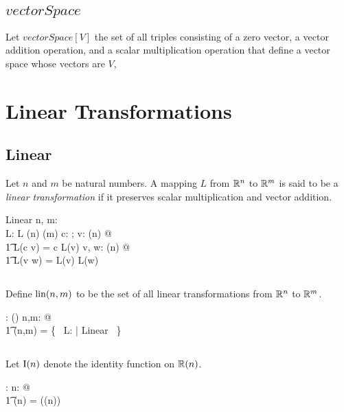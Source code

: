 \documentclass[11pt, oneside]{article}
\begin{document}
\subsection{$vectorSpace$}

Let $vectorSpace[V]$ the set of all triples consisting of a zero vector, a vector addition operation, and a scalar multiplication operation
that define a vector space whose vectors are $V$,

\section{Linear Transformations}

\subsection{Linear}

Let $n$ and $m$ be natural numbers.
A mapping $L$ from $\mathbb{R}^n$ to $\mathbb{R}^m$ is said to be a {\it linear transformation} if it preserves scalar multiplication and vector addition.
\begin{schema}{Linear}
	n, m: \nat \\
	L: \Rinf \pfun \Rinf
\where
	L \in \Rtuples(n) \fun \Rtuples(m)
\also
	\forall c: \R; v: \Rtuples(n) @ \\
	\t1	L(c \smulR v) = c \smulR L(v)
\also
	\forall v, w: \Rtuples(n) @ \\
	\t1	L(v \vaddR w) = L(v) \vaddR L(w)
\end{schema}

\subsection{}

Define $\operatorname{lin}(n,m)$ to be the set of all linear transformations from $\mathbb{R}^n$ to $\mathbb{R}^m$.
\begin{axdef}
	\linR: \nat \cross \nat \fun \power(\Rinf \pfun \Rinf)
\where
	\forall n,m: \nat @ \\
	\t1	\linR(n,m) = \{~ L: \Rinf \pfun \Rinf | Linear ~\}
\end{axdef}

\subsection{}

Let $\operatorname{I}(n)$ denote the identity function on $\mathbb{R}(n)$.

\begin{axdef}
	\In: \nat \fun \Rinf \pfun \Rinf
\where
	\forall n: \nat @ \\
	\t1	\In(n) = \id(\Rtuples(n))
\end{axdef}
\end{document}
